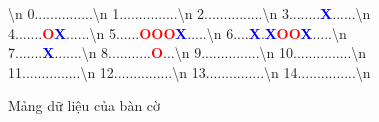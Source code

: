 \begin{figure}[!htbp]
    \centering
    \ttfamily
    \vs \vs {}\vs {}\vs {}\vs {}\vs {}\vs {}\vs {}\vs {}\vs {}\vs {}\textbackslash n
    0\vs\vs .\vs\vs .\vs\vs .\vs\vs .\vs\vs .\vs\vs .\vs\vs .\vs\vs .\vs\vs .\vs\vs .\vs\vs .\vs\vs .\vs\vs .\vs\vs .\vs\vs .\textbackslash n
    1\vs\vs .\vs\vs .\vs\vs .\vs\vs .\vs\vs .\vs\vs .\vs\vs .\vs\vs .\vs\vs .\vs\vs .\vs\vs .\vs\vs .\vs\vs .\vs\vs .\vs\vs .\textbackslash n
    2\vs\vs .\vs\vs .\vs\vs .\vs\vs .\vs\vs .\vs\vs .\vs\vs .\vs\vs .\vs\vs .\vs\vs .\vs\vs .\vs\vs .\vs\vs .\vs\vs .\vs\vs .\textbackslash n
    3\vs\vs .\vs\vs .\vs\vs .\vs\vs .\vs\vs .\vs\vs .\vs\vs .\vs\vs .\vs\vs \textcolor{blue}{\textbf{X}}\vs\vs .\vs\vs .\vs\vs .\vs\vs .\vs\vs .\vs\vs .\textbackslash n
    4\vs\vs .\vs\vs .\vs\vs .\vs\vs .\vs\vs .\vs\vs .\vs\vs .\vs\vs \textcolor{red}{\textbf{O}}\vs\vs \textcolor{blue}{\textbf{X}}\vs\vs .\vs\vs .\vs\vs .\vs\vs .\vs\vs .\vs\vs .\textbackslash n
    5\vs\vs .\vs\vs .\vs\vs .\vs\vs .\vs\vs .\vs\vs .\vs\vs \textcolor{red}{\textbf{O}}\vs\vs \textcolor{red}{\textbf{O}}\vs\vs \textcolor{red}{\textbf{O}}\vs\vs \textcolor{blue}{\textbf{X}}\vs\vs .\vs\vs .\vs\vs .\vs\vs .\vs\vs .\textbackslash n
    6\vs\vs .\vs\vs .\vs\vs .\vs\vs .\vs\vs \textcolor{blue}{\textbf{X}}\vs\vs .\vs\vs \textcolor{blue}{\textbf{X}}\vs\vs \textcolor{red}{\textbf{O}}\vs\vs \textcolor{red}{\textbf{O}}\vs\vs \textcolor{blue}{\textbf{X}}\vs\vs .\vs\vs .\vs\vs .\vs\vs .\vs\vs .\textbackslash n
    7\vs\vs .\vs\vs .\vs\vs .\vs\vs .\vs\vs .\vs\vs .\vs\vs .\vs\vs \textcolor{blue}{\textbf{X}}\vs\vs .\vs\vs .\vs\vs .\vs\vs .\vs\vs .\vs\vs .\vs\vs .\textbackslash n
    8\vs\vs .\vs\vs .\vs\vs .\vs\vs .\vs\vs .\vs\vs .\vs\vs .\vs\vs .\vs\vs .\vs\vs .\vs\vs .\vs\vs \textcolor{red}{\textbf{O}}\vs\vs .\vs\vs .\vs\vs .\textbackslash n
    9\vs\vs .\vs\vs .\vs\vs .\vs\vs .\vs\vs .\vs\vs .\vs\vs .\vs\vs .\vs\vs .\vs\vs .\vs\vs .\vs\vs .\vs\vs .\vs\vs .\vs\vs .\textbackslash n
    10\vs .\vs\vs .\vs\vs .\vs\vs .\vs\vs .\vs\vs .\vs\vs .\vs\vs .\vs\vs .\vs\vs .\vs\vs .\vs\vs .\vs\vs .\vs\vs .\vs\vs .\textbackslash n
    11\vs .\vs\vs .\vs\vs .\vs\vs .\vs\vs .\vs\vs .\vs\vs .\vs\vs .\vs\vs .\vs\vs .\vs\vs .\vs\vs .\vs\vs .\vs\vs .\vs\vs .\textbackslash n
    12\vs .\vs\vs .\vs\vs .\vs\vs .\vs\vs .\vs\vs .\vs\vs .\vs\vs .\vs\vs .\vs\vs .\vs\vs .\vs\vs .\vs\vs .\vs\vs .\vs\vs .\textbackslash n
    13\vs .\vs\vs .\vs\vs .\vs\vs .\vs\vs .\vs\vs .\vs\vs .\vs\vs .\vs\vs .\vs\vs .\vs\vs .\vs\vs .\vs\vs .\vs\vs .\vs\vs .\textbackslash n
    14\vs .\vs\vs .\vs\vs .\vs\vs .\vs\vs .\vs\vs .\vs\vs .\vs\vs .\vs\vs .\vs\vs .\vs\vs .\vs\vs .\vs\vs .\vs\vs .\vs\vs .\textbackslash n
    \caption{Mảng dữ liệu của bàn cờ}
    \label{fig:board_array}
\end{figure}

